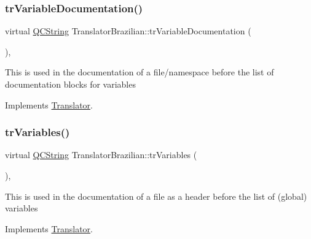 \mbox{\label{class_translator_brazilian_a190f58095888ba21251372961e6cd428}} 
\subsubsection{\texorpdfstring{trVariableDocumentation()}{trVariableDocumentation()}}
{\footnotesize\ttfamily virtual \mbox{\hyperlink{class_q_c_string}{Q\+C\+String}} Translator\+Brazilian\+::tr\+Variable\+Documentation (\begin{DoxyParamCaption}{ }\end{DoxyParamCaption})\hspace{0.3cm}{\ttfamily [inline]}, {\ttfamily [virtual]}}

This is used in the documentation of a file/namespace before the list of documentation blocks for variables 

Implements \mbox{\hyperlink{class_translator}{Translator}}.

\mbox{\label{class_translator_brazilian_ad7ad3b249c9fa289fdd910ecc5c64669}} 
\subsubsection{\texorpdfstring{trVariables()}{trVariables()}}
{\footnotesize\ttfamily virtual \mbox{\hyperlink{class_q_c_string}{Q\+C\+String}} Translator\+Brazilian\+::tr\+Variables (\begin{DoxyParamCaption}{ }\end{DoxyParamCaption})\hspace{0.3cm}{\ttfamily [inline]}, {\ttfamily [virtual]}}

This is used in the documentation of a file as a header before the list of (global) variables 

Implements \mbox{\hyperlink{class_translator}{Translator}}.

\mbox{\label{class_translator_brazilian_a9afd12cbe1654a177cf3607a29489061}} 
